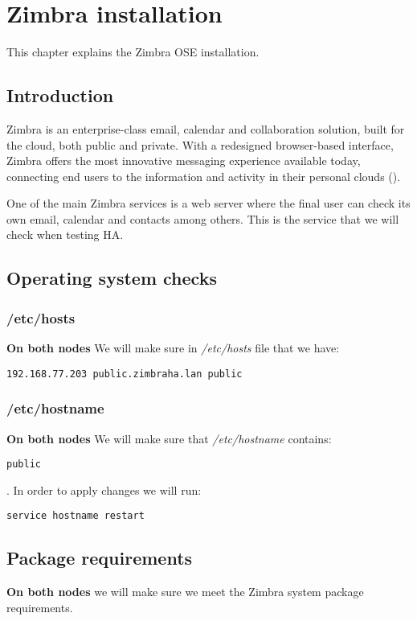 

\chapter{Zimbra installation}
\label{chap:zimbra-installation}
This chapter explains the Zimbra OSE installation.

\section {Introduction}
Zimbra is an enterprise-class email, calendar and collaboration solution, built for the cloud, both public and private. With a redesigned browser-based interface, Zimbra offers the most innovative messaging experience available today, connecting end users to the information and activity in their personal clouds (\cite{ZimbraWeb}).

One of the main Zimbra services is a web server where the final user can check its own email, calendar and contacts among others. This is the service that we will check when testing HA.

\section {Operating system checks}
\subsection {/etc/hosts}
\textbf{On both nodes}
We will make sure in \textit{/etc/hosts} file that we have:

\begin{verbatim}
192.168.77.203 public.zimbraha.lan public
\end{verbatim}
\subsection {/etc/hostname}
\textbf{On both nodes}
We will make sure that \textit{/etc/hostname} contains:

\begin{verbatim}
public
\end{verbatim}
. In order to apply changes we will run:
\begin{verbatim}
service hostname restart
\end{verbatim}

\section {Package requirements}
\textbf{On both nodes} we will make sure we meet the Zimbra system package requirements.

